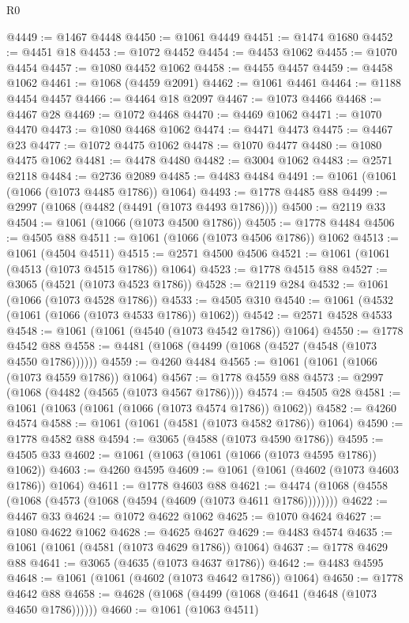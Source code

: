 \begin{lexlean}{R0}
\begin{coremodule}
@4449 := @1467 @4448
@4450 := @1061 @4449
@4451 := @1474 @1680
@4452 := @4451 @18
@4453 := @1072 @4452
@4454 := @4453 @1062
@4455 := @1070 @4454
@4457 := @1080 @4452 @1062
@4458 := @4455 @4457
@4459 := @4458 @1062
@4461 := @1068 (@4459 @2091)
@4462 := @1061 @4461
@4464 := @1188 @4454 @4457
@4466 := @4464 @18 @2097
@4467 := @1073 @4466
@4468 := @4467 @28
@4469 := @1072 @4468
@4470 := @4469 @1062
@4471 := @1070 @4470
@4473 := @1080 @4468 @1062
@4474 := @4471 @4473
@4475 := @4467 @23
@4477 := @1072 @4475 @1062
@4478 := @1070 @4477
@4480 := @1080 @4475 @1062
@4481 := @4478 @4480
@4482 := @3004 @1062
@4483 := @2571 @2118
@4484 := @2736 @2089
@4485 := @4483 @4484
@4491 := @1061 (@1061 (@1066 (@1073 @4485 @1786)) @1064)
@4493 := @1778 @4485 @88
@4499 := @2997 (@1068 (@4482 (@4491 (@1073 @4493 @1786))))
@4500 := @2119 @33
@4504 := @1061 (@1066 (@1073 @4500 @1786))
@4505 := @1778 @4484
@4506 := @4505 @88
@4511 := @1061 (@1066 (@1073 @4506 @1786)) @1062
@4513 := @1061 (@4504 @4511)
@4515 := @2571 @4500 @4506
@4521 := @1061 (@1061 (@4513 (@1073 @4515 @1786)) @1064)
@4523 := @1778 @4515 @88
@4527 := @3065 (@4521 (@1073 @4523 @1786))
@4528 := @2119 @284
@4532 := @1061 (@1066 (@1073 @4528 @1786))
@4533 := @4505 @310
@4540 := @1061 (@4532 (@1061 (@1066 (@1073 @4533 @1786)) @1062))
@4542 := @2571 @4528 @4533
@4548 := @1061 (@1061 (@4540 (@1073 @4542 @1786)) @1064)
@4550 := @1778 @4542 @88
@4558 := @4481 (@1068 (@4499 (@1068 (@4527 (@4548 (@1073 @4550 @1786))))))
@4559 := @4260 @4484
@4565 := @1061 (@1061 (@1066 (@1073 @4559 @1786)) @1064)
@4567 := @1778 @4559 @88
@4573 := @2997 (@1068 (@4482 (@4565 (@1073 @4567 @1786))))
@4574 := @4505 @28
@4581 := @1061 (@1063 (@1061 (@1066 (@1073 @4574 @1786)) @1062))
@4582 := @4260 @4574
@4588 := @1061 (@1061 (@4581 (@1073 @4582 @1786)) @1064)
@4590 := @1778 @4582 @88
@4594 := @3065 (@4588 (@1073 @4590 @1786))
@4595 := @4505 @33
@4602 := @1061 (@1063 (@1061 (@1066 (@1073 @4595 @1786)) @1062))
@4603 := @4260 @4595
@4609 := @1061 (@1061 (@4602 (@1073 @4603 @1786)) @1064)
@4611 := @1778 @4603 @88
@4621 := @4474 (@1068 (@4558 (@1068 (@4573 (@1068 (@4594 (@4609 (@1073 @4611 @1786))))))))
@4622 := @4467 @33
@4624 := @1072 @4622 @1062
@4625 := @1070 @4624
@4627 := @1080 @4622 @1062
@4628 := @4625 @4627
@4629 := @4483 @4574
@4635 := @1061 (@1061 (@4581 (@1073 @4629 @1786)) @1064)
@4637 := @1778 @4629 @88
@4641 := @3065 (@4635 (@1073 @4637 @1786))
@4642 := @4483 @4595
@4648 := @1061 (@1061 (@4602 (@1073 @4642 @1786)) @1064)
@4650 := @1778 @4642 @88
@4658 := @4628 (@1068 (@4499 (@1068 (@4641 (@4648 (@1073 @4650 @1786))))))
@4660 := @1061 (@1063 @4511)

\end{coremodule}
\end{lexlean}
